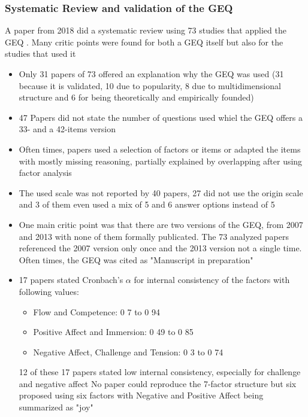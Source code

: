 \subsubsection{Systematic Review and validation of the GEQ}
A paper from 2018 did a systematic review using 73 studies that applied the GEQ \cite{law2018systematic}. Many critic points were found for both a GEQ itself but also for the studies that used it 
\begin{itemize}
	\item Only 31 papers of 73 offered an explanation why the GEQ was used (31 because it is validated, 10 due to popularity, 8 due to multidimensional structure and 6 for being theoretically and empirically founded) 
	\item 47 Papers did not state the number of questions used whiel the GEQ offers a 33- and a 42-items version 
	\item Often times, papers used a selection of factors or items or adapted the items with mostly missing reasoning, partially explained by overlapping after using factor analysis 
	\item The used scale was not reported by 40 papers, 27 did not use the origin scale and 3 of them even used a mix of 5 and 6 answer options instead of 5 
	\item One main critic point was that there are two versions of the GEQ, from 2007 and 2013 with none of them formally publicated. The 73 analyzed papers referenced the 2007 version only once and the 2013 version not a single time. Often times, the GEQ was cited as "Manuscript in preparation" 
	\item 17 papers stated Cronbach's $\alpha$ for internal consistency of the factors with following values:
	\begin{itemize}
		\item Flow and Competence: 0 7 to 0 94
		\item Positive Affect and Immersion: 0 49 to 0 85
		\item Negative Affect, Challenge and Tension: 0 3 to 0 74
	\end{itemize}
12 of these 17 papers stated low internal consistency, especially for challenge and negative affect 
No paper could reproduce the 7-factor structure but six proposed using six factors with Negative and Positive Affect being summarized as "joy" 
\end{itemize}

